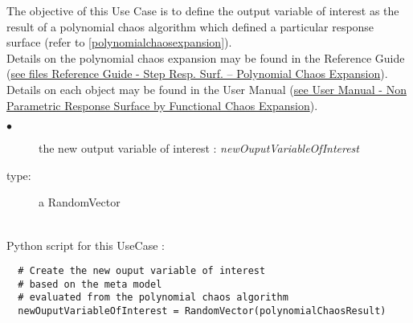\renewcommand{\filename}{docUC_OVI_PolyChaosExp.tex}
\renewcommand{\filetitle}{UC : Creation of the output variable of interest from the result of a polynomial chaos expansion}

\HeaderIIILevel


\label{RandomVectorPolynomialChaos}




The objective of this Use Case is to define the output variable of interest as the result of a polynomial chaos algorithm which defined a particular response surface (refer to \ref{polynomialchaosexpansion}).\\

Details on the polynomial chaos expansion may be found in the Reference Guide (\href{OpenTURNS_ReferenceGuide.pdf}{see files Reference Guide - Step Resp. Surf. -- Polynomial Chaos Expansion}).\\

Details on each object may be found in the User Manual  (\href{OpenTURNS_UserManual_TUI.pdf}{see User Manual - Non Parametric Response Surface by Functional Chaos Expansion}).\\


{
  \begin{description}
  \item[$\bullet$] the new output variable of interest : {\itshape newOuputVariableOfInterest}
  \item[type:] a RandomVector
  \end{description}
}

\textspace\\
Python script for this UseCase :

\begin{lstlisting}
  # Create the new ouput variable of interest
  # based on the meta model
  # evaluated from the polynomial chaos algorithm
  newOuputVariableOfInterest = RandomVector(polynomialChaosResult)
\end{lstlisting}
